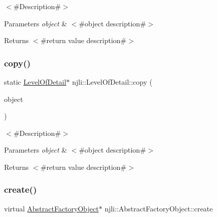 $<$\#\+Description\#$>$


\begin{DoxyParams}{Parameters}
{\em object} & $<$\#object description\#$>$\\
\hline
\end{DoxyParams}
\begin{DoxyReturn}{Returns}
$<$\#return value description\#$>$ 
\end{DoxyReturn}
\mbox{\label{classnjli_1_1_level_of_detail_a8b9f86076c3a59dbb5785ef7999d0596}} 
\subsubsection{\texorpdfstring{copy()}{copy()}}
{\footnotesize\ttfamily static \mbox{\hyperlink{classnjli_1_1_level_of_detail}{Level\+Of\+Detail}}$\ast$ njli\+::\+Level\+Of\+Detail\+::copy (\begin{DoxyParamCaption}\item[{const \mbox{\hyperlink{classnjli_1_1_level_of_detail}{Level\+Of\+Detail}} \&}]{object }\end{DoxyParamCaption})\hspace{0.3cm}{\ttfamily [static]}}

$<$\#\+Description\#$>$


\begin{DoxyParams}{Parameters}
{\em object} & $<$\#object description\#$>$\\
\hline
\end{DoxyParams}
\begin{DoxyReturn}{Returns}
$<$\#return value description\#$>$ 
\end{DoxyReturn}
\mbox{\label{classnjli_1_1_level_of_detail_a83a8876ae63b92804004cf3febe76573}} 
\subsubsection{\texorpdfstring{create()}{create()}\hspace{0.1cm}{\footnotesize\ttfamily [1/3]}}
{\footnotesize\ttfamily virtual \mbox{\hyperlink{classnjli_1_1_abstract_factory_object}{Abstract\+Factory\+Object}}$\ast$ njli\+::\+Abstract\+Factory\+Object\+::create}

